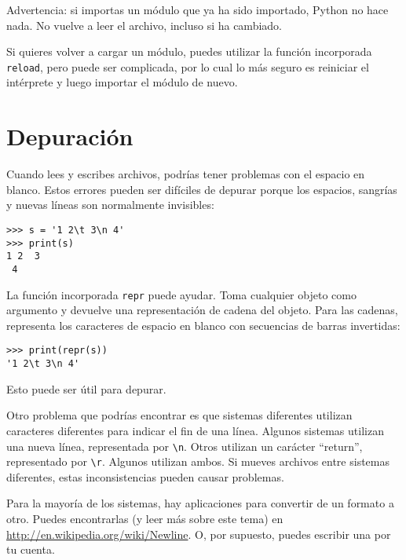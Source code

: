 \documentclass[10pt]{book}
\begin{document}
Advertencia: si importas un módulo que ya ha sido importado,
Python no hace nada.  No vuelve a leer el archivo, incluso si ha
cambiado.

Si quieres volver a cargar un módulo, puedes utilizar la función incorporada
{\tt reload}, pero puede ser complicada, por lo cual lo más seguro es
reiniciar el intérprete y luego importar el módulo de nuevo.


\section{Depuración}

Cuando lees y escribes archivos, podrías tener problemas
con el espacio en blanco.  Estos errores pueden ser difíciles de depurar porque los espacios,
sangrías y nuevas líneas son normalmente invisibles:

\begin{verbatim}
>>> s = '1 2\t 3\n 4'
>>> print(s)
1 2	 3
 4
\end{verbatim}

La función incorporada {\tt repr} puede ayudar.  Toma cualquier objeto como
argumento y devuelve una representación de cadena del objeto.  Para
las cadenas, representa los caracteres de
espacio en blanco con secuencias de barras invertidas:

\begin{verbatim}
>>> print(repr(s))
'1 2\t 3\n 4'
\end{verbatim}

Esto puede ser útil para depurar.

Otro problema que podrías encontrar es que sistemas diferentes
utilizan caracteres diferentes para indicar el fin de una línea.  Algunos
sistemas utilizan una nueva línea, representada por \verb"\n".  Otros utilizan
un carácter ``return'', representado por \verb"\r".  Algunos utilizan ambos.
Si mueves archivos entre sistemas diferentes, estas inconsistencias
pueden causar problemas.


Para la mayoría de los sistemas, hay aplicaciones para convertir de
un formato a otro.  Puedes encontrarlas (y leer más sobre este
tema) en \url{http://en.wikipedia.org/wiki/Newline}.  O, por supuesto,
puedes escribir una por tu cuenta.
\end{document}
